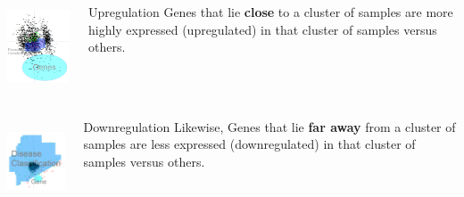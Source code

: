 \documentclass[serif]{beamer}
\begin{document}
\begin{frame}[t]
		{
			\begin{columns}
				\begin{column}{1.5in}
					\begin{center}
						\includegraphics[width=1.5in,height=1.0in]{images/biplot_expl/up_reg}
					\end{center}
				\end{column}
				\begin{column}{2.5in}
					\begin{block}{Upregulation}	
						Genes that lie \textbf{close} to a cluster of samples are more highly expressed (upregulated) in that cluster of samples versus others.
					\end{block}
				\end{column}
			\end{columns}
			\vspace{0.30in}
			\begin{columns}
				\begin{column}{1.5in}
					\begin{center}
						\includegraphics[width=1.5in,height=1.0in]{images/biplot_expl/down_reg}
					\end{center}
				\end{column}
				\begin{column}{2.5in}
					\begin{block}{Downregulation}
						Likewise, Genes that lie \textbf{far away} from a cluster of samples are less expressed (downregulated) in that cluster of samples versus others.
					\end{block}
				\end{column}
			\end{columns}
		}
		
		
		
	\end{frame}
	
	
\end{document}
